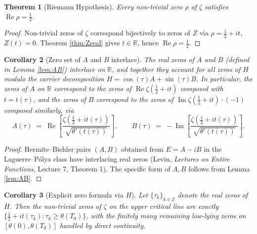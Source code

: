 \documentclass[11pt]{article}
\newtheorem{theorem}{Theorem}
\newtheorem{corollary}[theorem]{Corollary}
\theoremstyle{definition}
\DeclareMathOperator{\Real}{Re}
\DeclareMathOperator{\Imag}{Im}
\begin{document}
\begin{theorem}[Riemann Hypothesis]\label{thm:RH}
Every non-trivial zero $\rho$ of $\zeta$ satisfies $\Real\rho = \tfrac12$.
\end{theorem}

\begin{proof}
Non-trivial zeros of $\zeta$ correspond bijectively to zeros of $Z$ via $\rho = \tfrac12 + it$, $Z(t) = 0$. Theorem \ref{thm:Zreal} gives $t \in \mathbb{R}$, hence $\Real\rho = \tfrac12$.
\end{proof}

\begin{corollary}[Zero set of $A$ and $B$ interlace]
The real zeros of $A$ and $B$ (defined in Lemma \ref{lem:AB}) interlace on $\mathbb{R}$, and together they account for all zeros of $H$ modulo the carrier decomposition $H = \cos(\tau)A + \sin(\tau)B$. In particular, the zeros of $A$ on $\mathbb{R}$ correspond to the zeros of $\Real\zeta(\tfrac12+it)$ composed with $t = t(\tau)$, and the zeros of $B$ correspond to the zeros of $\Imag\zeta(\tfrac12+it) \cdot (-1)$ composed similarly, via
\[
A(\tau) \;=\; \Real\!\left[\frac{\zeta(\tfrac12+it(\tau))}{\sqrt{\theta'(t(\tau))}}\right], \qquad
B(\tau) \;=\; -\Imag\!\left[\frac{\zeta(\tfrac12+it(\tau))}{\sqrt{\theta'(t(\tau))}}\right].
\]
\end{corollary}

\begin{proof}
Hermite--Biehler pairs $(A, B)$ obtained from $E = A - iB$ in the Laguerre--Pólya class have interlacing real zeros (Levin, \emph{Lectures on Entire Functions}, Lecture 7, Theorem 1). The specific form of $A, B$ follows from Lemma \ref{lem:AB}.
\end{proof}

\begin{corollary}[Explicit zero formula via $H$]
Let $\{\tau_k\}_{k \in \mathbb{Z}}$ denote the real zeros of $H$. Then the non-trivial zeros of $\zeta$ on the upper critical line are exactly $\{\tfrac12 + it(\tau_k) : \tau_k \ge \theta(T_0)\}$, with the finitely many remaining low-lying zeros on $[\theta(0), \theta(T_0)]$ handled by direct continuity.
\end{corollary}
\end{document}
